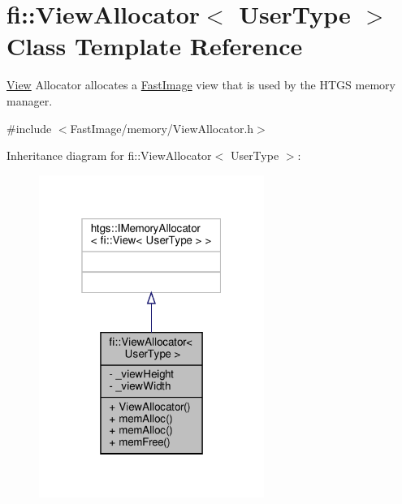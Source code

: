 \hypertarget{classfi_1_1ViewAllocator}{}\section{fi\+:\+:View\+Allocator$<$ User\+Type $>$ Class Template Reference}
\label{classfi_1_1ViewAllocator}


\hyperlink{classfi_1_1View}{View} Allocator allocates a \hyperlink{classfi_1_1FastImage}{Fast\+Image} view that is used by the H\+T\+GS memory manager.  




{\ttfamily \#include $<$Fast\+Image/memory/\+View\+Allocator.\+h$>$}



Inheritance diagram for fi\+:\+:View\+Allocator$<$ User\+Type $>$\+:
\nopagebreak
\begin{figure}[H]
\begin{center}
\leavevmode
\includegraphics[width=208pt]{df/dac/classfi_1_1ViewAllocator__inherit__graph}
\end{center}
\end{figure}


